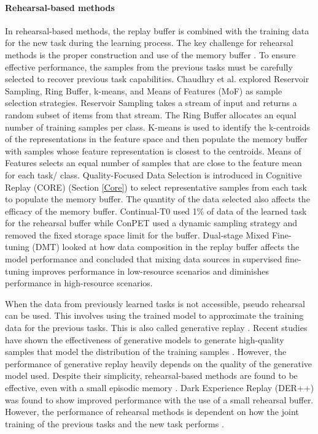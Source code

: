 \paragraph{Rehearsal-based methods} \label{Rehearsal} In rehearsal-based methods, the replay buffer is combined with the training data for the new task during the learning process. The key challenge for rehearsal methods is the proper construction and use of the memory buffer \cite{wang2024comprehensive}. To ensure effective performance, the samples from the previous tasks must be carefully selected to recover previous task capabilities. Chaudhry et al. \cite{chaudhry2019tiny} explored Reservoir Sampling, Ring Buffer, k-means, and Means of Features (MoF) as sample selection strategies. Reservoir Sampling takes a stream of input and returns a random subset of items from that stream. The Ring Buffer allocates an equal number of training samples per class. K-means is used to identify the k-centroids of the representations in the feature space and then populate the memory buffer with samples whose feature representation is closest to the centroids. Means of Features selects an equal number of samples that are close to the feature mean for each task/ class. Quality-Focused Data Selection is introduced in Cognitive Replay (CORE) \cite{zhang2024core} (Section \ref{Core}) to select representative samples from each task to populate the memory buffer. The quantity of the data selected also affects the efficacy of the memory buffer. Continual-T0 \cite{scialom2022fine} used 1\% of data of the learned task for the rehearsal buffer while ConPET \cite{song2023conpet} used a dynamic sampling strategy and removed the fixed storage space limit for the buffer. Dual-stage Mixed Fine-tuning (DMT) \cite{dong2023abilities} looked at how data composition in the replay buffer affects the model performance and concluded that mixing data sources in supervised fine-tuning improves performance in low-resource scenarios and diminishes performance in high-resource scenarios. 

When the data from previously learned tasks is not accessible, pseudo rehearsal can be used. This involves using the trained model to approximate the training data for the previous tasks. This is also called generative replay \cite{wang2024comprehensive}. Recent studies have shown the effectiveness of generative models to generate high-quality samples that model the distribution of the training samples \cite{shin2017continual}. However, the performance of generative replay heavily depends on the quality of the generative model used. Despite their simplicity, rehearsal-based methods are found to be effective, even with a small episodic memory \cite{shi2024continual}. Dark Experience Replay (DER++) \cite{buzzega2020dark} was found to show improved performance with the use of a small rehearsal buffer. However, the performance of rehearsal methods is dependent on how the joint training of the previous tasks and the new task performs \cite{de2021continual}.

